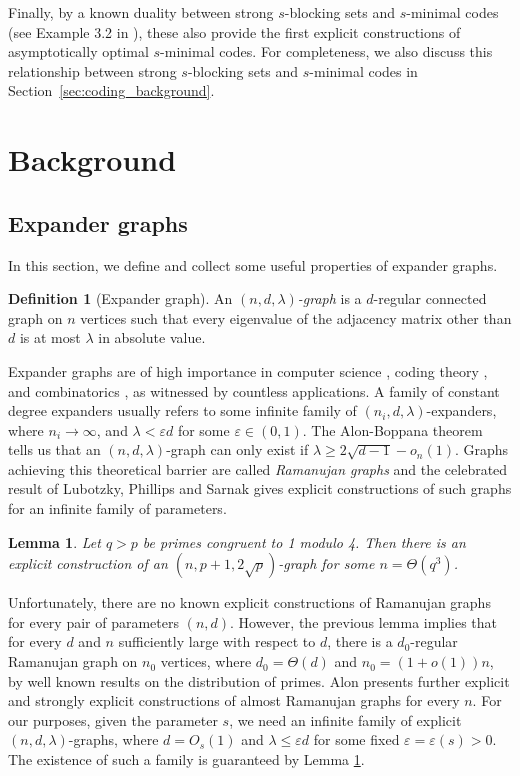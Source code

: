 \documentclass[11pt]{article}
\theoremstyle{plain}
\newtheorem{lemma}[theorem]{Lemma}
\theoremstyle{definition}
\newtheorem{definition}{Definition}
\begin{document}
Finally, by a known duality between strong $s$-blocking sets and $s$-minimal codes (see Example 3.2 in \cite{xu2024}), these also provide the first explicit constructions of asymptotically optimal $s$-minimal codes. For completeness, we also discuss this relationship between strong $s$-blocking sets and $s$-minimal codes in Section~\ref{sec:coding_background}.

\section{Background}\label{sect:background}

\subsection{Expander graphs}
In this section, we define and collect some useful properties of expander graphs. 

\begin{definition}[Expander graph]
    An \emph{$(n,d,\lambda)$-graph} is a $d$-regular connected graph on $n$ vertices such that every eigenvalue of the adjacency matrix other than $d$ is at most $\lambda$ in absolute value.
\end{definition}

Expander graphs are of high importance in computer science \cite{AC,HLW}, coding theory \cite{alon2024strong,sipser1996expander}, and combinatorics \cite{LPY}, as witnessed by countless applications. A family of constant degree expanders usually refers to some infinite family of $(n_i,d,\lambda)$-expanders, where $n_i\rightarrow\infty$, and $\lambda<\varepsilon d$ for some $\varepsilon\in (0,1)$. The Alon-Boppana theorem tells us that an $(n,d,\lambda)$-graph can only exist if $\lambda\geq 2\sqrt{d-1}-o_n(1)$. Graphs achieving this theoretical barrier are called \emph{Ramanujan graphs} and the celebrated result of Lubotzky, Phillips and Sarnak \cite{LPS} gives explicit constructions of such graphs for an infinite family of parameters.

\begin{lemma}\label{lemma:Ramanujan}
Let $q>p$ be primes congruent to 1 modulo 4. Then there is an explicit construction of an $(n,p+1,2\sqrt{p})$-graph for some $n=\Theta(q^3)$.
\end{lemma}

Unfortunately, there are no known explicit constructions of Ramanujan graphs for every pair of parameters $(n,d)$. However, the previous lemma implies that for every $d$ and $n$ sufficiently large with respect to $d$, there is a $d_0$-regular Ramanujan graph on $n_0$ vertices, where $d_0=\Theta(d)$ and $n_0=(1+o(1))n$, by well known results on the distribution of primes. Alon \cite{alon2021explicit} presents further explicit and strongly explicit constructions of almost Ramanujan graphs for every $n$. For our purposes, given the parameter $s$, we need an infinite family of explicit $(n,d,\lambda)$-graphs, where $d=O_s(1)$ and $\lambda\leq \varepsilon d$ for some fixed $\varepsilon=\varepsilon(s)>0$. The existence of such a family is guaranteed by Lemma \ref{lemma:Ramanujan}. 
\end{document}
